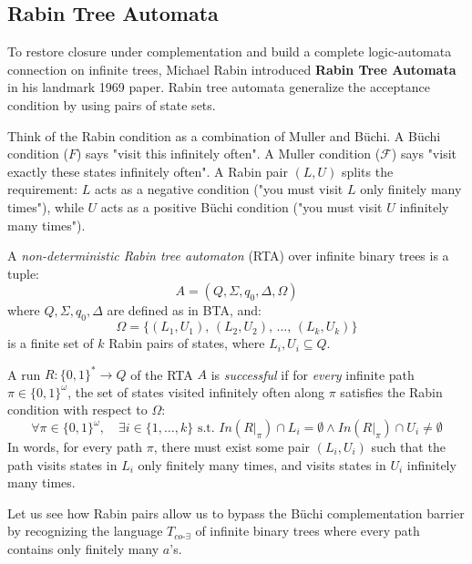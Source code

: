 \subsection{Rabin Tree Automata}
To restore closure under complementation and build a complete logic-automata connection on infinite trees, Michael Rabin introduced \textbf{Rabin Tree Automata} in his landmark 1969 paper. Rabin tree automata generalize the acceptance condition by using pairs of state sets.

Think of the Rabin condition as a combination of Muller and Büchi. A Büchi condition ($F$) says "visit this infinitely often". A Muller condition ($\mathcal{F}$) says "visit exactly these states infinitely often". A Rabin pair $(L, U)$ splits the requirement: $L$ acts as a negative condition ("you must visit $L$ only finitely many times"), while $U$ acts as a positive Büchi condition ("you must visit $U$ infinitely many times").

\begin{definition}
A \emph{non-deterministic Rabin tree automaton} (RTA) over infinite binary trees is a tuple:
$$A = (Q, \Sigma, q_0, \Delta, \Omega)$$
where $Q, \Sigma, q_0, \Delta$ are defined as in BTA, and:
$$\Omega = \{ (L_1, U_1), \, (L_2, U_2), \, \dots, \, (L_k, U_k) \}$$
is a finite set of $k$ Rabin pairs of states, where $L_i, U_i \subseteq Q$.
\end{definition}

\begin{definition}
A run $R: \{0,1\}^* \to Q$ of the RTA $A$ is \emph{successful} if for \emph{every} infinite path $\pi \in \{0,1\}^\omega$, the set of states visited infinitely often along $\pi$ satisfies the Rabin condition with respect to $\Omega$:
$$\forall \pi \in \{0,1\}^\omega, \quad \exists i \in \{1, \dots, k\} \text{ s.t. } In(R|_\pi) \cap L_i = \emptyset \land In(R|_\pi) \cap U_i \neq \emptyset$$
In words, for every path $\pi$, there must exist some pair $(L_i, U_i)$ such that the path visits states in $L_i$ only finitely many times, and visits states in $U_i$ infinitely many times.
\end{definition}

Let us see how Rabin pairs allow us to bypass the Büchi complementation barrier by recognizing the language $T_{co\text{-}\exists}$ of infinite binary trees where every path contains only finitely many $a$'s.

